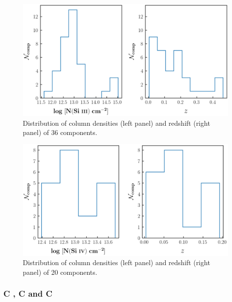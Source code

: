 \begin{figure}
    \centering
    \includegraphics[width=\linewidth]{Figures/SiIII_distribution_survey.png}
    \caption{Distribution of column densities (left panel) and redshift (right panel) of 36  components.}
    \label{fig:SiIII_distribution}
\end{figure}

\begin{figure}
    \centering
    \includegraphics[width=\linewidth]{Figures/SiIV_distribution_survey.png}
    \caption{Distribution of column densities (left panel) and redshift (right panel) of 20  components.}
    \label{fig:SiIV_distribution}
\end{figure}

\subsubsection*{C \hspace*{-0.5mm}{\footnotesize II}, C \hspace*{-0.5mm}{\footnotesize III} and C \hspace*{-0.5mm}{\footnotesize IV}}

